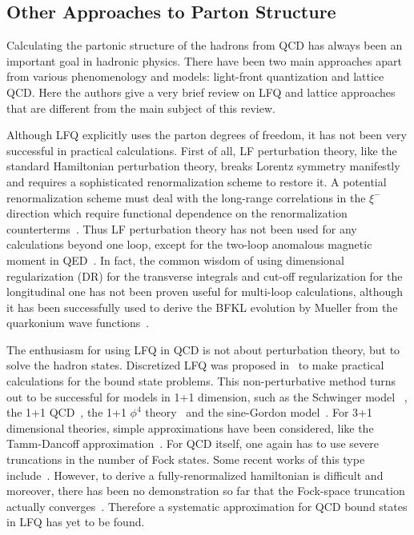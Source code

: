 \documentclass[aps,rmp,reprint,amsmath,amssymb,graphicx,longbibliography]{revtex4-1} %
\begin{document}
\subsection{Other Approaches to Parton Structure}
\label{sec:intro_other}

Calculating the partonic structure of the hadrons from QCD has always
been an important goal in hadronic physics. There have been two main
approaches apart from various phenomenology and models: light-front quantization
and lattice QCD. Here the authors give a very brief review on LFQ and lattice
approaches that are different from the main subject of this review.

Although LFQ explicitly uses the parton degrees of freedom, it has not been very successful
in practical calculations. First of all, LF perturbation theory,
like the standard Hamiltonian perturbation theory, breaks Lorentz
symmetry manifestly and requires a sophisticated renormalization scheme to restore it.
A potential renormalization scheme must deal with the long-range correlations
in the $\xi^-$ direction which require functional dependence on
the renormalization counterterms~\cite{Wilson:1994fk}. Thus LF perturbation theory has not been used
for any calculations beyond one loop, except for the two-loop anomalous magnetic
moment in QED~\cite{Langnau:1992zj}. In fact, the common wisdom
of using dimensional regularization (DR) for the transverse integrals
and cut-off regularization for the longitudinal one has not been proven useful for
multi-loop calculations, although it has been successfully used to
derive the BFKL evolution by Mueller from the quarkonium wave
functions~\cite{Mueller:1993rr}.

The enthusiasm for using LFQ in QCD is not about perturbation theory, but to solve the hadron states.
Discretized LFQ was proposed in~\cite{Pauli:1985ps} to
make practical calculations for the
bound state problems. This non-perturbative method turns out to be successful
for models in 1+1 dimension, such as the Schwinger
model ~\cite{McCartor:1994im,Harada:1995au}, the 1+1 QCD~\cite{Burkardt:1989wy,Srivastava:2000cf},
the 1+1 $\phi^4$ theory~\cite{Harindranath:1987db} and the sine-Gordon model~\cite{Burkardt:1992sz}.
For 3+1 dimensional theories, simple approximations have been considered, like
the Tamm-Dancoff approximation~\cite{Perry:1990mz}. For QCD itself, one again has
to use severe truncations in the number of Fock states. Some recent works
of this type include~\cite{Vary:2009gt,Lan:2019vui,Jia:2019iyk}.
However, to derive a fully-renormalized hamiltonian is difficult and moreover,
there has been no demonstration so far that the Fock-space truncation actually converges~\cite{Wilson:1994fk}.
Therefore a systematic approximation for QCD bound states in LFQ has yet to be found.
\end{document}
